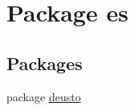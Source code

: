 \hypertarget{namespacees}{}\section{Package es}
\label{namespacees}
\subsection*{Packages}
\begin{DoxyCompactItemize}
\item 
package \mbox{\hyperlink{namespacees_1_1deusto}{deusto}}
\end{DoxyCompactItemize}
